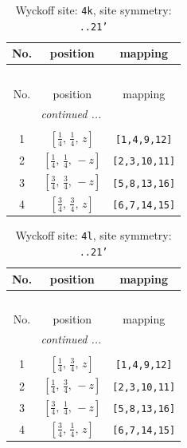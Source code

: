 \documentclass[fleqn,8pt]{jsarticle}
\begin{document}
\renewcommand{\arraystretch}{1.2}
\begin{longtable}{ccc}
\caption{Wyckoff site: {\tt 4k}, site symmetry: {\tt ..21'}}
 \\
 \hline \hline
No. & position & mapping \\ \hline \endfirsthead

\multicolumn{2}{l}{\tablename\ \thetable{}} \\
 \hline \hline
No. & position & mapping \\ \hline \endhead

 \hline \hline
\multicolumn{2}{r}{\footnotesize\it continued ...} \\ \endfoot

 \hline \hline
\multicolumn{2}{r}{} \\ \endlastfoot

1 & $\left[ \frac{1}{4},\, \frac{1}{4},\, z \right]$ & {\tt [1,4,9,12]} \\ \hline
2 & $\left[ \frac{1}{4},\, \frac{1}{4},\, - z \right]$ & {\tt [2,3,10,11]} \\ \hline
3 & $\left[ \frac{3}{4},\, \frac{3}{4},\, - z \right]$ & {\tt [5,8,13,16]} \\ \hline
4 & $\left[ \frac{3}{4},\, \frac{3}{4},\, z \right]$ & {\tt [6,7,14,15]} \\
\end{longtable}
\renewcommand{\arraystretch}{1.2}
\begin{longtable}{ccc}
\caption{Wyckoff site: {\tt 4l}, site symmetry: {\tt ..21'}}
 \\
 \hline \hline
No. & position & mapping \\ \hline \endfirsthead

\multicolumn{2}{l}{\tablename\ \thetable{}} \\
 \hline \hline
No. & position & mapping \\ \hline \endhead

 \hline \hline
\multicolumn{2}{r}{\footnotesize\it continued ...} \\ \endfoot

 \hline \hline
\multicolumn{2}{r}{} \\ \endlastfoot

1 & $\left[ \frac{1}{4},\, \frac{3}{4},\, z \right]$ & {\tt [1,4,9,12]} \\ \hline
2 & $\left[ \frac{1}{4},\, \frac{3}{4},\, - z \right]$ & {\tt [2,3,10,11]} \\ \hline
3 & $\left[ \frac{3}{4},\, \frac{1}{4},\, - z \right]$ & {\tt [5,8,13,16]} \\ \hline
4 & $\left[ \frac{3}{4},\, \frac{1}{4},\, z \right]$ & {\tt [6,7,14,15]} \\
\end{longtable}
\end{document}
